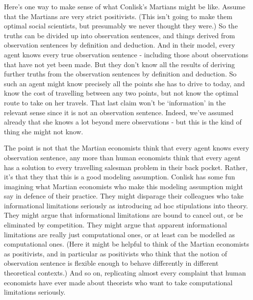 \documentclass[
  11pt,
]{book}
\begin{document}
Here's one way to make sense of what Conlisk's Martians might be like. Assume that the Martians are very strict positivists. (This isn't going to make them optimal social scientists, but presumably we never thought they were.) So the truths can be divided up into observation sentences, and things derived from observation sentences by definition and deduction. And in their model, every agent knows every true observation sentence - including those about observations that have not yet been made. But they don't know all the results of deriving further truths from the observation sentences by definition and deduction. So such an agent might know precisely all the points she has to drive to today, and know the cost of travelling between any two points, but not know the optimal route to take on her travels. That last claim won't be `information' in the relevant sense since it is not an observation sentence. Indeed, we've assumed already that she knows a lot beyond mere observations - but this is the kind of thing she might not know.

The point is not that the Martian economists think that every agent knows every observation sentence, any more than human economists think that every agent has a solution to every travelling salesman problem in their back pocket. Rather, it's that they that this is a good modeling assumption. Conlisk has some fun imagining what Martian economists who make this modeling assumption might say in defence of their practice. They might disparage their colleagues who take informational limitations seriously as introducing ad hoc stipulations into theory. They might argue that informational limitations are bound to cancel out, or be eliminated by competition. They might argue that apparent informational limitations are really just computational ones, or at least can be modelled as computational ones. (Here it might be helpful to think of the Martian economists as positivists, and in particular as positivists who think that the notion of observation sentence is flexible enough to behave differently in different theoretical contexts.) And so on, replicating almost every complaint that human economists have ever made about theorists who want to take computational limitations seriously.
\end{document}
